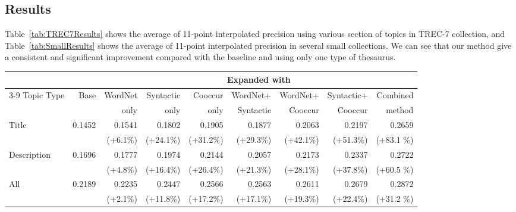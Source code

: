 \subsection{Results}
Table~\ref{tab:TREC7Results} shows the average of 11-point interpolated precision using various section of topics in TREC-7 collection, and Table~\ref{tab:SmallResults} shows the average of 11-point interpolated precision in several small collections. We can see that our method give a consistent and significant improvement compared with the baseline and using only one type of thesaurus.

\begin{table*}[hbpt]
  \begin{center}
    \caption{Experiment results using TREC-7 Collection }
    \vspace{3mm}
   \tiny
   \begin{tabular}{|l|r|r|r|r|r|r|r|r|} \hline
      &         &    \multicolumn{7}{|c|}{{\bf Expanded with}}\\ \cline{3-9}
Topic Type&    Base &   WordNet& Syntactic &  Cooccur & WordNet+&WordNet+&Syntactic+& Combined\\ 
      &         & only   & only    &  only & Syntactic&Cooccur&Cooccur&method\\ \hline 
Title &0.1452 & 0.1541  & 0.1802 & 0.1905 & 0.1877 & 0.2063 & 0.2197 &0.2659 \\ 
&  &  (+6.1\%) & (+24.1\%)  & (+31.2\%)  & (+29.3\%) & (+42.1\%)  & (+51.3\%) & (+83.1
\%) \\ \hline 
Description & 0.1696 & 0.1777  & 0.1974 & 0.2144 & 0.2057 & 0.2173 & 0.2337 &0.2722 \\ 
 & &  (+4.8\%) & (+16.4\%)  & (+26.4\%)  & (+21.3\%) & (+28.1\%)  & (+37.8\%) & (+60.5
\%) \\ \hline
All &0.2189 & 0.2235  & 0.2447 & 0.2566 & 0.2563 & 0.2611 & 0.2679 &0.2872 \\ 
  & &  (+2.1\%) & (+11.8\%)  & (+17.2\%)  & (+17.1\%) & (+19.3\%)  & (+22.4\%) & (+31.2
\%) \\ \hline
    \end{tabular}
   \label{tab:TREC7Results}
  \end{center}
\end{table*}
\normalsize



